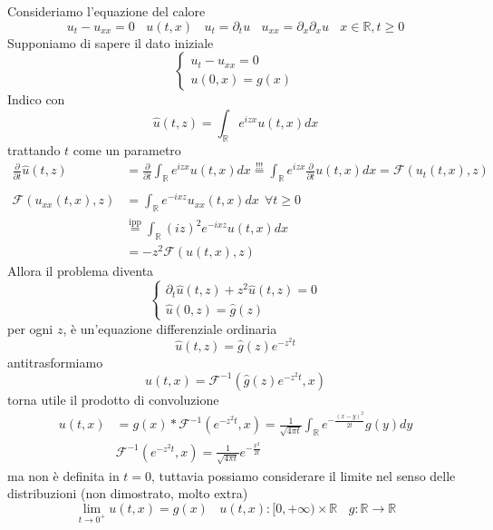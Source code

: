 \documentclass[10pt,a4paper,twoside]{book}
\begin{document}
Consideriamo l'equazione del calore
\begin{equation*}
u_{t} -u_{xx} =0\ \ \ \ u( t,x) \ \ \ \ u_{t} =\partial _{t} u\ \ \ \ u_{xx} =\partial _{x} \partial _{x} u\ \ \ \ x\in \mathbb{R} ,t\geqslant 0
\end{equation*}
Supponiamo di sapere il dato iniziale
\begin{equation*}
\begin{cases}
u_{t} -u_{xx} =0\\
u( 0,x) =g( x)
\end{cases}
\end{equation*}
Indico con
\begin{equation*}
\hat{u}( t,z) =\int _{\mathbb{R}} e^{izx} u( t,x) dx
\end{equation*}
trattando $t$ come un parametro
\begin{equation*}
\begin{aligned}
\frac{\partial }{\partial t}\hat{u}( t,z) & =\frac{\partial }{\partial t}\int _{\mathbb{R}} e^{izx} u( t,x) dx\overset{!!!}{=}\int _{\mathbb{R}} e^{izx}\frac{\partial }{\partial t} u( t,x) dx=\mathcal{F}( u_{t}( t,x) ,z)\\
 & \\
\mathcal{F}( u_{xx}( t,x) ,z) & =\int _{\mathbb{R}} e^{-ixz} u_{xx}( t,x) dx\ \ \forall t\geqslant 0\\
 & \overset{\text{ipp}}{=}\int _{\mathbb{R}}( iz)^{2} e^{-ixz} u( t,x) dx\\
 & =-z^{2}\mathcal{F}( u( t,x) ,z)
\end{aligned}
\end{equation*}
Allora il problema diventa
\begin{equation*}
\begin{cases}
\partial _{t}\hat{u}( t,z) +z^{2}\hat{u}( t,z) =0\\
\hat{u}( 0,z) =\hat{g}( z)
\end{cases}
\end{equation*}
per ogni $z$, è un'equazione differenziale ordinaria
\begin{equation*}
\hat{u}( t,z) =\hat{g}( z) e^{-z^{2} t}
\end{equation*}
antitrasformiamo
\begin{equation*}
u( t,x) =\mathcal{F}^{-1}\left(\hat{g}( z) e^{-z^{2} t} ,x\right)
\end{equation*}
torna utile il prodotto di convoluzione
\begin{equation*}
\begin{aligned}
u( t,x) & =g( x) *\mathcal{F}^{-1}\left( e^{-z^{2} t} ,x\right) =\frac{1}{\sqrt{4\pi t}}\int _{\mathbb{R}} e^{-\frac{( x-y)^{2}}{2t}} g( y) dy\\
 & \mathcal{F}^{-1}\left( e^{-z^{2} t} ,x\right) =\frac{1}{\sqrt{4\pi t}} e^{-\frac{x^{2}}{2t}}
\end{aligned}
\end{equation*}
ma non è definita in $t=0$, tuttavia possiamo considerare il limite nel senso delle distribuzioni (non dimostrato, molto extra)
\begin{equation*}
\lim _{t\rightarrow 0^{+}} u( t,x) =g( x) \ \ \ \ u( t,x) :[ 0,+\infty ) \times \mathbb{R} \ \ \ \ g:\mathbb{R}\rightarrow \mathbb{R}
\end{equation*}
\end{document}
